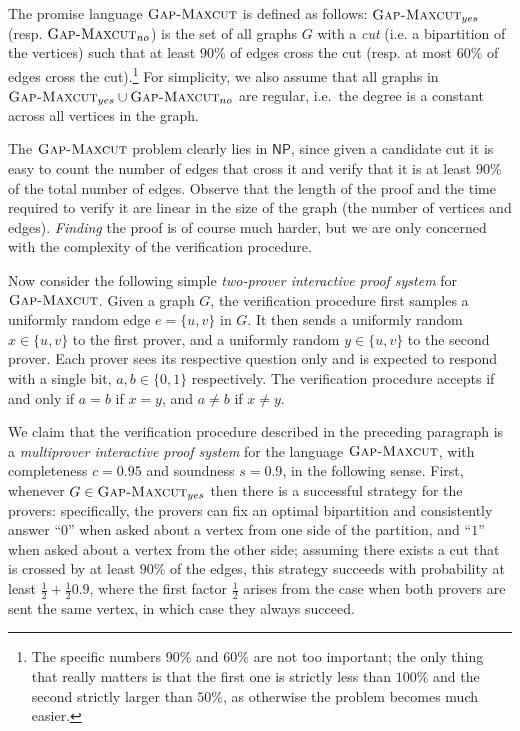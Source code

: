 \documentclass[11pt]{article}
\theoremstyle{definition}
\newcommand{\GX}{\textsc{Gap-Maxcut}}
\newcommand{\class}[1]{\ensuremath{\mathsf{#1}}\xspace}
\newcommand{\NP}{\class{NP}} \newcommand{\IP}{\class{IP}} \newcommand{\EXP}{\class{EXP}} \newcommand{\NEXP}{\class{NEXP}} \newcommand{\QMA}{\class{QMA}} \newcommand{\QMIP}{\class{QMIP}} \WithSuffix\newcommand\QMIP*{\ensuremath{\class{QMIP}^*}} \newcommand{\PSPACE}{\class{PSPACE}} \newcommand{\PCP}{\class{PCP}} \newcommand{\MIP}{\class{MIP}} \newcommand{\MIPco}{\class{MIP}^{\mathrm{co}}} \newcommand{\RE}{\class{RE}} \newcommand{\coRE}{\class{coRE}}
\begin{document}
The promise language $\GX$ is defined as follows: $\GX_{yes}$ (resp. $\GX_{no}$) is the set of all graphs $G$ with a \emph{cut} (i.e. a bipartition of the vertices) such that at least $90\%$ of edges cross the cut (resp. at most $60\%$ of edges cross the cut).\footnote{The specific numbers $90\%$ and $60\%$ are not too important; the only thing that really matters is that the first one is strictly less than $100\%$ and the second strictly larger than $50\%$, as otherwise the problem becomes much easier.} For simplicity, we also assume that all graphs in $\GX_{yes}\cup \GX_{no}$ are regular, i.e.\ the degree is a constant across all vertices in the graph. 

The $\GX$ problem clearly lies in $\NP$, since given a candidate cut it is easy to count the number of edges that cross it and verify that it is at least $90\%$ of the total number of edges. Observe that the length of the proof and the time required to verify it are linear in the size of the graph (the number of vertices and edges). \emph{Finding} the proof is of course much harder, but we are only concerned with the complexity of the verification procedure.

Now consider the following simple \emph{two-prover interactive proof system} for $\GX$. Given a graph $G$, the verification procedure first samples a uniformly random edge $e=\{u,v\}$ in $G$. It then sends a uniformly random $x\in\{u,v\}$ to the first prover, and a uniformly random $y\in \{u,v\}$ to the second prover. Each prover sees its respective question only and is expected to respond with a single bit, $a,b\in\{0,1\}$ respectively. The verification procedure accepts if and only if $a=b$ if $x=y$, and $a\neq b$ if $x\neq y$.

We claim that the verification procedure described in the preceding paragraph is a \emph{multiprover interactive proof system} for the language $\GX$, with completeness $c=0.95$ and soundness $s=0.9$, in the following sense. First, whenever $G\in \GX_{yes}$ then there is a successful strategy for the provers: specifically, the provers can fix an optimal bipartition and consistently answer ``$0$'' when asked about a vertex from one side of the partition, and ``$1$'' when asked about a vertex from the other side; assuming there exists a cut that is crossed by at least $90\%$ of the edges, this strategy succeeds with probability at least $\frac{1}{2} + \frac{1}{2}0.9$, where the first factor $\frac{1}{2}$ arises from the case when both provers are sent the same vertex, in which case they always succeed. 
\end{document}
